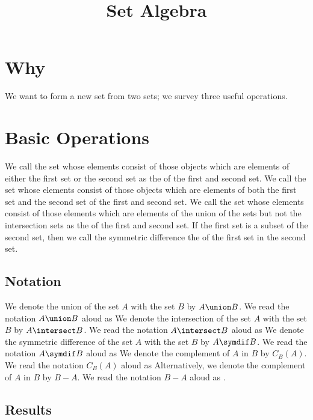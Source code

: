 






\title{Set Algebra}

\section{Why}

We want to form a new set from two sets; we survey three useful operations.

\section{Basic Operations}

We call the set whose elements consist of those objects which are elements of either the first set or the second set as the  of the first and second set.
We call the set whose elements consist of those objects which are elements of both the first set and the second set  of the first and second set.
We call the set whose elements consist of those elements which are elements of the union of the sets but not the intersection sets as the  of the first and second set.
If the first set is a subset of the second set, then we call the symmetric difference the  of the first set in the second set.

\subsection{Notation}

We denote the union of the set $A$ with the set $B$ by $A \union B$.
We read the notation $A \union B$ aloud as 
We denote the intersection of the set $A$ with the set $B$ by $A \intersect B$.
We read the notation $A \intersect B$ aloud as 
We denote the symmetric difference of the set $A$ with the set $B$ by $A \symdif B$.
We read the notation $A \symdif B$ aloud as 
We denote the complement of $A$ in $B$ by $C_B(A)$.
We read the notation $C_B(A)$ aloud as 
Alternatively, we denote the complement of $A$ in $B$ by $B - A$.
We read the notation $B - A$ aloud as .

\subsection{Results}

